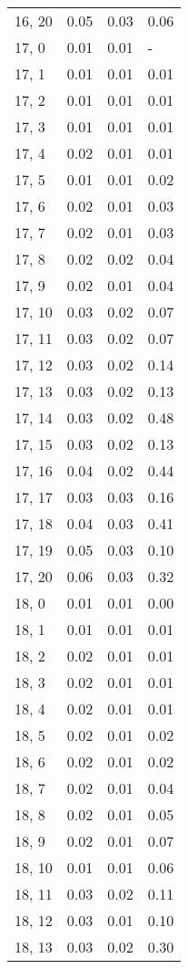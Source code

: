 \begin{table}
\begin{tabular}{llll}
16, 20 &  0.05 &  0.03 &  0.06 \\
17, 0  &  0.01 &  0.01 &     - \\
17, 1  &  0.01 &  0.01 &  0.01 \\
17, 2  &  0.01 &  0.01 &  0.01 \\
17, 3  &  0.01 &  0.01 &  0.01 \\
17, 4  &  0.02 &  0.01 &  0.01 \\
17, 5  &  0.01 &  0.01 &  0.02 \\
17, 6  &  0.02 &  0.01 &  0.03 \\
17, 7  &  0.02 &  0.01 &  0.03 \\
17, 8  &  0.02 &  0.02 &  0.04 \\
17, 9  &  0.02 &  0.01 &  0.04 \\
17, 10 &  0.03 &  0.02 &  0.07 \\
17, 11 &  0.03 &  0.02 &  0.07 \\
17, 12 &  0.03 &  0.02 &  0.14 \\
17, 13 &  0.03 &  0.02 &  0.13 \\
17, 14 &  0.03 &  0.02 &  0.48 \\
17, 15 &  0.03 &  0.02 &  0.13 \\
17, 16 &  0.04 &  0.02 &  0.44 \\
17, 17 &  0.03 &  0.03 &  0.16 \\
17, 18 &  0.04 &  0.03 &  0.41 \\
17, 19 &  0.05 &  0.03 &  0.10 \\
17, 20 &  0.06 &  0.03 &  0.32 \\
18, 0  &  0.01 &  0.01 &  0.00 \\
18, 1  &  0.01 &  0.01 &  0.01 \\
18, 2  &  0.02 &  0.01 &  0.01 \\
18, 3  &  0.02 &  0.01 &  0.01 \\
18, 4  &  0.02 &  0.01 &  0.01 \\
18, 5  &  0.02 &  0.01 &  0.02 \\
18, 6  &  0.02 &  0.01 &  0.02 \\
18, 7  &  0.02 &  0.01 &  0.04 \\
18, 8  &  0.02 &  0.01 &  0.05 \\
18, 9  &  0.02 &  0.01 &  0.07 \\
18, 10 &  0.01 &  0.01 &  0.06 \\
18, 11 &  0.03 &  0.02 &  0.11 \\
18, 12 &  0.03 &  0.01 &  0.10 \\
18, 13 &  0.03 &  0.02 &  0.30 \\

\end{tabular}
\end{table}
